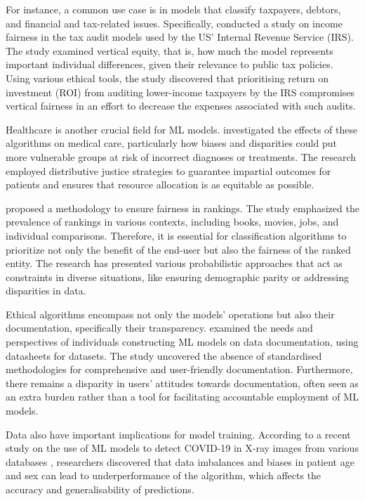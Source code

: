 \documentclass[twoside,11pt]{article}
\begin{document}
For instance, a common use case is in models that classify taxpayers, debtors, and financial and tax-related issues. Specifically,  conducted a study on income fairness in the tax audit models used by the US' Internal Revenue Service (IRS). The study examined vertical equity, that is, how much the model represents important individual differences, given their relevance to public tax policies. Using various ethical tools, the study discovered that prioritising return on investment (ROI) from auditing lower-income taxpayers by the IRS compromises vertical fairness in an effort to decrease the expenses associated with such audits.

Healthcare is another crucial field for ML models.  investigated the effects of these algorithms on medical care, particularly how biases and disparities could put more vulnerable groups at risk of incorrect diagnoses or treatments. The research employed distributive justice strategies to guarantee impartial outcomes for patients and ensures that resource allocation is as equitable as possible.

 proposed a methodology to ensure fairness in rankings. The study emphasized the prevalence of rankings in various contexts, including books, movies, jobs, and individual comparisons. Therefore, it is essential for classification algorithms to prioritize not only the benefit of the end-user but also the fairness of the ranked entity. The research has presented various probabilistic approaches that act as constraints in diverse situations, like ensuring demographic parity or addressing disparities in data.

Ethical algorithms encompass not only the models' operations but also their documentation, specifically their transparency.  examined the needs and perspectives of individuals constructing ML models on data documentation, using datasheets for datasets. The study uncovered the absence of standardised methodologies for comprehensive and user-friendly documentation. Furthermore, there remains a disparity in users' attitudes towards documentation, often seen as an extra burden rather than a tool for facilitating accountable employment of ML models.

Data also have important implications for model training. According to a recent study on the use of ML models to detect COVID-19 in X-ray images from various databases , researchers discovered that data imbalances and biases in patient age and sex can lead to underperformance of the algorithm, which affects the accuracy and generalisability of predictions.
\end{document}
